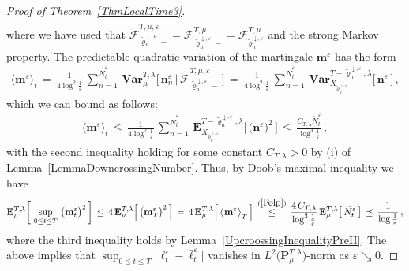 \documentclass[10pt]{article}
\def\stackrel#1#2{\mathrel{\mathop{#2}\limits^{#1}}}
\numberwithin{equation}{section}
\theoremstyle{definition}
\begin{document}
\begin{proof}[Proof of Theorem~\ref{ThmLocalTime3}]
\begin{align*}
\end{align*}
where we have used that $\widetilde{\mathscr{F}}_{\widetilde{\varrho}_{n}^{\downarrow,\varepsilon}-}^{T,\mu,\varepsilon}=\mathscr{F}_{\widetilde{\varrho}_{n}^{\downarrow,\varepsilon}-}^{T,\mu} =\mathscr{F}_{\widetilde{\varrho}_{n}^{\downarrow,\varepsilon}}^{T,\mu} $ and the strong Markov property.
  The predictable quadratic variation of the martingale $ \mathbf{m}^{\varepsilon}$ has the form
\begin{align*}
 \big\langle \mathbf{m}^{\varepsilon}\big\rangle_t\,=\,  \frac{1}{4\log^2 \frac{1}{\varepsilon} } \,\sum_{n=1}^{\widetilde{N}_t^{\varepsilon}}\, \mathbf{Var}^{T,\lambda}_{\mu }\Big[\,  \mathbf{n}^{\varepsilon}_n \,\Big|\,   \widetilde{\mathscr{F}}_{\widetilde{\varrho}_{n}^{\downarrow,\varepsilon}-}^{T,\mu,\varepsilon}\,\Big] \,=\,  \frac{1}{4\log^2 \frac{1}{\varepsilon} }\, \sum_{n=1}^{\widetilde{N}_t^{\varepsilon}}\, \mathbf{Var}^{T-\widetilde{\varrho}_{n}^{\downarrow,\varepsilon},\lambda}_{X_{\widetilde{\varrho}_{n}^{\downarrow,\varepsilon} }}\big[\,  \mathbf{n}^{\varepsilon}\,\big] \,,\nonumber
\end{align*}
which we can bound  as follows:
\begin{align} \label{Folp}
 \langle \mathbf{m}^{\varepsilon}\rangle_t\,\leq \, \frac{1}{4\log^2 \frac{1}{\varepsilon} }\, \sum_{n=1}^{\widetilde{N}_t^{\varepsilon}} \,\mathbf{E}^{T-\widetilde{\varrho}_{n}^{\downarrow,\varepsilon},\lambda}_{X_{\widetilde{\varrho}_{n}^{\downarrow,\varepsilon}} }\Big[ \, \big(\mathbf{n}^{\varepsilon}\big)^2\, \Big] \,\leq \,  \frac{ C_{T,\lambda}\widetilde{N}_t^{\varepsilon} }{ \log^3 \frac{1}{\varepsilon}   }   \,,
\end{align}
with the second inequality holding for some constant $C_{T,\lambda}>0$ by  (i) of Lemma~\ref{LemmaDowncrossingNumber}.  Thus, by Doob's maximal inequality we have
\begin{align*}
\mathbf{E}^{T,\lambda}_{\mu }\bigg[ \,\sup_{0\leq t\leq T} \, \big(\mathbf{m}_t^{\varepsilon} \big)^2 \, \bigg] \,\leq \,4\,\mathbf{E}^{T,\lambda}_{\mu }\Big[ \,\big(\mathbf{m}_T^{\varepsilon} \big)^2 \, \Big] \,=\,4 \,
 \mathbf{E}^{T,\lambda}_{\mu }\Big[ \, \big\langle \mathbf{m}^{\varepsilon}\big\rangle_T \, \Big] \,\stackrel{(\ref{Folp})}{\leq} \,\frac{ 4\,C_{T,\lambda} }{ \log^3 \frac{1}{\varepsilon}   }\,  
 \mathbf{E}^{T,\lambda}_{\mu }\big[ \, \widetilde{N}_t^{\varepsilon}\,\big] \,\preceq \, \frac{ 1 }{ \log \frac{1}{\varepsilon}   }   \,,
\end{align*}
where the third inequality holds by Lemma~\ref{UpcroossingInequalityPreII}. The above implies that   $ \sup_{0\leq t\leq T}\big| \boldsymbol{\ell}_t^{\varepsilon} -\boldsymbol{\bar{\ell}}_t^{\varepsilon} \big|   $ vanishes in $L^2\big(\mathbf{P}^{T,\lambda}_{\mu }\big)$-norm as $\varepsilon \searrow 0$.


\end{proof}
\end{document}
